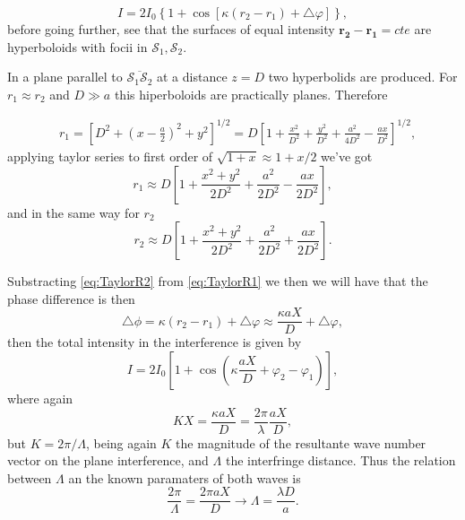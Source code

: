         \begin{equation}
            I = 2I_0 \left\{1 + \cos\left[\kappa \left(r_2-r_1\right) + \triangle\varphi \right]\right\},
        \end{equation}
        before going further, see that the surfaces of equal intensity $\mathbf{r_2-r_1}=cte$ are hyperboloids with focii in $\mathcal{S}_1,\mathcal{S}_2$.

        In a plane parallel to $\overline{\mathcal{S}_1\mathcal{S}_2}$ at a distance $z=D$ two hyperbolids are produced. For $r_1 \approx r_2$ and $D \gg a$ this hiperboloids are practically planes. Therefore

        \begin{align}\label{eq:TaylorR1}
            & r_1 = \left[D^2 + \left(x - \frac{a}{2}\right)^2 + y^2\right]^{1/2} = D \left[1 + \frac{x^2}{D^2} + \frac{y^2}{D^2} + \frac{a^2}{4D^2} - \frac{ax}{D^2}\right]^{1/2},
        \end{align}
        applying taylor series  to first order of $\sqrt{1+x} \approx 1 + x/2 $ we've got
        \begin{equation}
            r_1 \approx D\left[1 + \frac{x^2+y^2}{2D^2} + \frac{a^2}{2D^2} - \frac{ax}{2D^2}\right],
        \end{equation}
        and in the same way for $r_2$
        \begin{equation}\label{eq:TaylorR2}
            r_2 \approx D\left[1 + \frac{x^2+y^2}{2D^2} + \frac{a^2}{2D^2} + \frac{ax}{2D^2}\right].
        \end{equation}

        Substracting \ref{eq:TaylorR2} from \ref{eq:TaylorR1} we then we will have that the phase difference is then
        \begin{equation}
            \triangle\phi = \kappa \left(r_2-r_1\right) + \triangle\varphi \approx \frac{\kappa aX}{D} + \triangle\varphi,
        \end{equation}
        then the total intensity in the interference is given by
        \begin{equation}
            I = 2I_0 \left[1 + \cos\left(\kappa \frac{aX}{D} + \varphi_2-\varphi_1 \right)\right],
        \end{equation}
        where again 
        \begin{equation*}
            KX = \frac{\kappa aX}{D} = \frac{2\pi}{\lambda}\frac{aX}{D},
        \end{equation*}
        but $K = 2\pi/\Lambda$, being again $K$ the magnitude of the resultante wave number vector on the plane interference, and $\Lambda$ the interfringe distance. Thus the relation between $\Lambda$ an the known paramaters of both waves is 
        \begin{equation*}
            \frac{2\pi}{\Lambda} = \frac{2\pi aX}{D} \longrightarrow \Lambda = \frac{\lambda D}{a}.
        \end{equation*}


